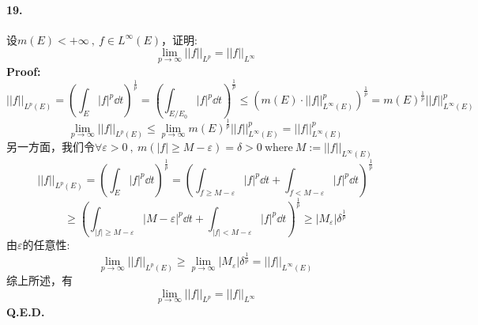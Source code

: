 \paragraph*{19.}设$m(E)<+\infty \ , \ f \in L^{\infty}(E)$，证明:
\[\lim_{p \to \infty}||f||_{L^p}=||f||_{L^{\infty}}\]
\textbf{Proof:}
\[||f||_{L^p(E)}=\left(\int_E|f|^p\dd t\right)^{\frac{1}{p}}=\left(\int_{E/E_0}|f|^p\dd t\right)^{\frac{1}{p}} \leq \left(m(E) \cdot ||f||^p_{L^{\infty}(E)}\right)^{\frac{1}{p}}=m(E)^{\frac{1}{p}}||f||^p_{L^{\infty}(E)}\]
\[\lim_{p \to \infty}||f||_{L^p(E)} \leq \lim_{p \to \infty}m(E)^{\frac{1}{p}}||f||^p_{L^{\infty}(E)}=||f||^p_{L^{\infty}(E)}\]
另一方面，我们令$\forall \varepsilon>0 \ , \ m(|f| \geq M-\varepsilon)=\delta>0 \ \text{where} \ M:=||f||_{L^{\infty}(E)}$
\[||f||_{L^p(E)}=\left(\int_E|f|^p\dd t\right)^{\frac{1}{p}}=\left(\int_{f \geq M-\varepsilon}|f|^p\dd t+\int_{f<M-\varepsilon}|f|^p\dd t\right)^{\frac{1}{p}}\]
\[\geq \left(\int_{|f| \geq M-\varepsilon}|M-\varepsilon|^p\dd t+\int_{|f|<M-\varepsilon}|f|^p\dd t\right)^{\frac{1}{p}} \geq |M_\varepsilon|\delta^{\frac{1}{p}}\]
由$\varepsilon$的任意性:
\[\lim_{p \to \infty}||f||_{L^p(E)} \geq \lim_{p \to \infty} |M_\varepsilon|\delta^{\frac{1}{p}}=||f||_{L^{\infty}(E)}\]
综上所述，有
\[\lim_{p \to \infty}||f||_{L^p}=||f||_{L^{\infty}}\]
\textbf{Q.E.D.}